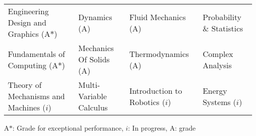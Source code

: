 
\begin{tabular*}{\textwidth}{l l l l}
  Engineering Design and Graphics (A$*$)& Dynamics (A) & Fluid Mechanics (A)  & Probability \& Statistics\\
  Fundamentals of Computing (A$*$) & Mechanics Of Solids (A) & Thermodynamics (A) & Complex Analysis\\
  Theory of Mechanisms and Machines ($i$) & Multi-Variable Calculus & Introduction to Robotics ($i$) & Energy Systems ($i$)

\end{tabular*}
{\footnotesize
    {A$*$: Grade for exceptional performance, $i$: In progress, A: grade}
}
